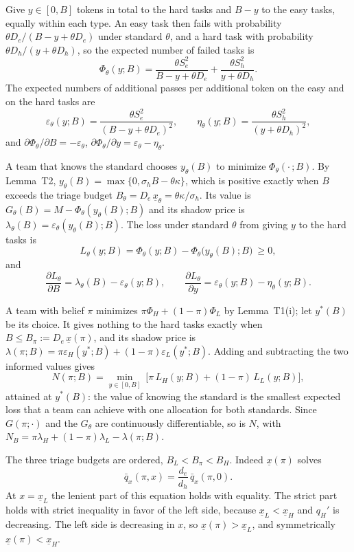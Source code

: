\documentclass[11pt]{article}
\theoremstyle{definition}
\begin{document}
Give $y\in[0,B]$ tokens in total to the hard tasks and $B-y$ to the easy tasks, equally within each type. An easy task then fails with probability $\theta D_e/(B-y+\theta D_e)$ under standard $\theta$, and a hard task with probability $\theta D_h/(y+\theta D_h)$, so the expected number of failed tasks is
\[
\Phi_\theta(y;B)=\frac{\theta S_e^2}{B-y+\theta D_e}+\frac{\theta S_h^2}{y+\theta D_h}.
\]
The expected numbers of additional passes per additional token on the easy and on the hard tasks are
\[
\varepsilon_\theta(y;B)=\frac{\theta S_e^2}{(B-y+\theta D_e)^2},\qquad
\eta_\theta(y;B)=\frac{\theta S_h^2}{(y+\theta D_h)^2},
\]
and $\partial\Phi_\theta/\partial B=-\varepsilon_\theta$, $\partial\Phi_\theta/\partial y=\varepsilon_\theta-\eta_\theta$.

A team that knows the standard chooses $y_\theta(B)$ to minimize $\Phi_\theta(\cdot\,;B)$. By Lemma~T2, $y_\theta(B)=\max\{0,\sigma_hB-\theta\kappa\}$, which is positive exactly when $B$ exceeds the triage budget $B_\theta=D_e\,\underline x_\theta=\theta\kappa/\sigma_h$. Its value is $G_\theta(B)=M-\Phi_\theta(y_\theta(B);B)$ and its shadow price is $\lambda_\theta(B)=\varepsilon_\theta(y_\theta(B);B)$. The loss under standard $\theta$ from giving $y$ to the hard tasks is
\[
L_\theta(y;B)=\Phi_\theta(y;B)-\Phi_\theta\bigl(y_\theta(B);B\bigr)\ \ge0,
\]
and
\begin{equation}\label{eq:Lder}
\frac{\partial L_\theta}{\partial B}=\lambda_\theta(B)-\varepsilon_\theta(y;B),\qquad
\frac{\partial L_\theta}{\partial y}=\varepsilon_\theta(y;B)-\eta_\theta(y;B).
\end{equation}

A team with belief $\pi$ minimizes $\pi\Phi_H+(1-\pi)\Phi_L$ by Lemma~T1(i); let $y^*(B)$ be its choice. It gives nothing to the hard tasks exactly when $B\le B_\pi:=D_e\,\underline x(\pi)$, and its shadow price is $\lambda(\pi;B)=\pi\varepsilon_H(y^*;B)+(1-\pi)\varepsilon_L(y^*;B)$. Adding and subtracting the two informed values gives
\begin{equation}\label{eq:N}
N(\pi;B)=\min_{y\in[0,B]}\ \bigl[\pi\,L_H(y;B)+(1-\pi)\,L_L(y;B)\bigr],
\end{equation}
attained at $y^*(B)$: the value of knowing the standard is the smallest expected loss that a team can achieve with one allocation for both standards. Since $G(\pi;\cdot)$ and the $G_\theta$ are continuously differentiable, so is $N$, with $N_B=\pi\lambda_H+(1-\pi)\lambda_L-\lambda(\pi;B)$.

The three triage budgets are ordered, $B_L<B_\pi<B_H$. Indeed $\underline x(\pi)$ solves
\[
\bar q_x(\pi,x)=\frac{d_e}{d_h}\,\bar q_x(\pi,0).
\]
At $x=\underline x_L$ the lenient part of this equation holds with equality. The strict part holds with strict inequality in favor of the left side, because $\underline x_L<\underline x_H$ and $q_H'$ is decreasing. The left side is decreasing in $x$, so $\underline x(\pi)>\underline x_L$, and symmetrically $\underline x(\pi)<\underline x_H$.
\end{document}
